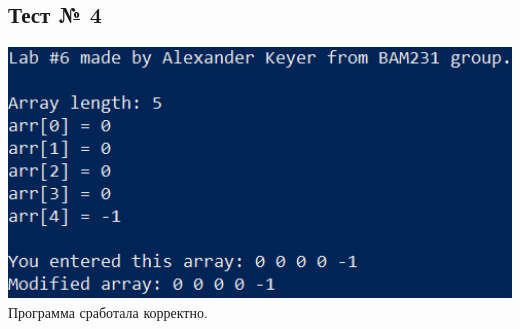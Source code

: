 \documentclass[12pt]{article}
\begin{document}
	\subsection*{Тест № 4}
	\includegraphics[width=400pt]{test_4}
	Программа сработала корректно.
	
\end{document}
